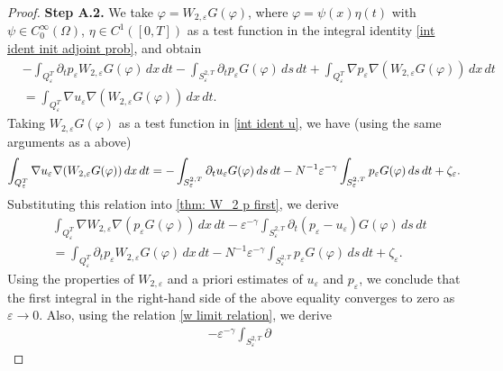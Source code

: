 \documentclass[reqno]{amsart}
\begin{document}
\begin{proof}
\noindent\textbf{Step A.2.} 
We take $\varphi =W_{2,\varepsilon }G(\varphi )$, where 
$\varphi =\psi (x)\eta (t)$ with $\psi \in C_0^{\infty }(\Omega )$, 
$\eta\in C^{1}([0,T])$ as a test function in the integral identity
\eqref{int ident init adjoint prob}, and obtain
\begin{equation}
\begin{aligned}
&-\int _{Q_{\varepsilon }^{T}}\partial _{t}p_{\varepsilon
}W_{2,\varepsilon }G(\varphi )\,dx\,dt-\int _{S_{\varepsilon
}^{2,T}}\partial _{t}p_{\varepsilon }G(\varphi )\,ds\,dt
+\int _{Q_{\varepsilon }^{T}}\nabla p_{\varepsilon }\nabla (W_{2,
\varepsilon }G(\varphi ))\,dx\,dt    \\
&=\int _{Q_{\varepsilon }^{T}}\nabla u_{\varepsilon }\nabla
(W_{2,\varepsilon }G(\varphi ))\,dx\,dt.
\end{aligned}  \label{thm: W_2 p first}
\end{equation}
Taking $W_{2,\varepsilon }G(\varphi )$ as a test function in
\eqref{int ident u}, we have (using the same arguments as a above)
\[
\int _{Q_{\varepsilon }^{T}}\nabla u_{\varepsilon }\nabla
(W_{2,\varepsilon }G(\varphi ))\,dx\,dt=-\int _{S_{\varepsilon
}^{2,T}}\partial _{t}u_{\varepsilon }G(\varphi )\,ds\,dt-N^{-1}\varepsilon
^{-\gamma }\int _{S_{\varepsilon }^{2,T}}p_{\varepsilon }G(\varphi ){%
\,ds\,dt}+\zeta _{\varepsilon }.
\]%
Substituting this relation into \eqref{thm: W_2 p first}, we derive
\begin{equation}
\begin{aligned}
&\int _{Q_{\varepsilon }^{T}}\nabla W_{2,\varepsilon }\nabla
(p_{\varepsilon }G(\varphi ))\,dx\,dt-\varepsilon ^{-\gamma
}\int _{S_{\varepsilon }^{2,T}}\partial _{t}(p_{\varepsilon
}-u_{\varepsilon })G(\varphi )\,ds\,dt    \\
&=\int _{Q_{\varepsilon }^{T}}\partial _{t}p_{\varepsilon
}W_{2,\varepsilon }G(\varphi )\,dx\,dt-N^{-1}\varepsilon ^{-\gamma
}\int _{S_{\varepsilon }^{2,T}}p_{\varepsilon }G(\varphi )\,ds\,dt+\zeta
_{\varepsilon }.
\end{aligned}  \label{thm: p ident G}
\end{equation}
Using the properties of $W_{2,\varepsilon }$ and a priori estimates of
$u_{\varepsilon }$ and $p_{\varepsilon }$, we conclude that the first
integral in the right-hand side of the above equality converges to zero as
$\varepsilon \to 0$. Also, using the relation \eqref{w limit relation}, we derive
\begin{equation}
\begin{aligned}
&-\varepsilon ^{-\gamma }\int _{S_{\varepsilon }^{2,T}}\partial

\end{aligned}
\end{equation}
\end{proof}
\end{document}

